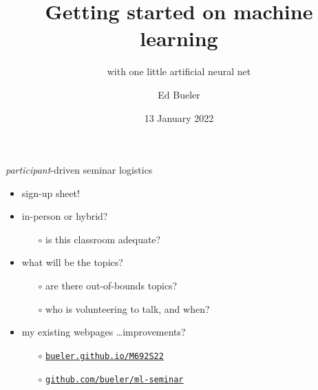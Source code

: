\documentclass[xcolor={svgnames},
               hyperref={colorlinks,citecolor=DeepPink4,linkcolor=FireBrick,urlcolor=Maroon}]
               {beamer}
\title{Getting started on machine learning}
\subtitle{{with one little artificial neural net}}
\author{Ed Bueler}
\institute[UAF]{MATH 692 Mathematics for Machine Learning \\ UAF}
\date[Spring 2022]{13 January 2022}
\begin{document}
\beamertemplatenavigationsymbolsempty

\begin{frame}
  \maketitle
\end{frame}


\begin{frame}{\emph{participant}-driven seminar logistics}

\begin{itemize}
\item sign-up sheet!
\item in-person or hybrid?
    \begin{itemize}
    \item[$\circ$] is this classroom adequate?
    \end{itemize}
\item what will be the topics?
    \begin{itemize}
    \item[$\circ$] are there out-of-bounds topics?
    \item[$\circ$] who is volunteering to talk, and when?
    \end{itemize}
\item my existing webpages \dots improvements?
    \begin{itemize}
    \item[$\circ$] \href{http://bueler.github.io/M692S22/index.html}{\texttt{bueler.github.io/M692S22}}
    \item[$\circ$] \href{https://github.com/bueler/ml-seminar}{\texttt{github.com/bueler/ml-seminar}}
    \end{itemize}
\end{itemize}
\end{frame}
\end{document}
